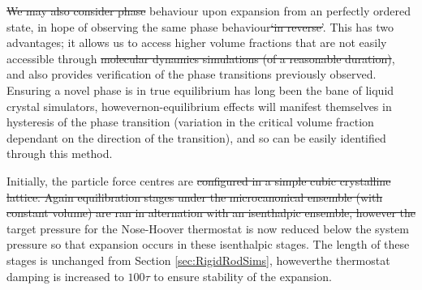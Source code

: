 \documentclass[11pt, a4paper]{article} %
\providecommand{\DIFadd}[1]{{\protect\color{blue}\uwave{#1}}} %
\providecommand{\DIFdel}[1]{{\protect\color{red}\sout{#1}}}                      %
\providecommand{\DIFaddbegin}{} %
\providecommand{\DIFaddend}{} %
\providecommand{\DIFdelbegin}{} %
\providecommand{\DIFdelend}{} %
\begin{document}
\DIFdelbegin \DIFdel{We may also consider phase }\DIFdelend \DIFaddbegin \DIFadd{\textcolor{forestgreen}{We also consider the phase} }\DIFaddend behaviour upon expansion from an perfectly ordered state, in hope of observing the same phase behaviour\DIFdelbegin \DIFdel{`in reverse'}\DIFdelend \DIFaddbegin \DIFadd{,\textcolor{forestgreen}{ which would be expected for an equilibrium system}}\DIFaddend . This has two advantages; it allows us to access higher volume fractions that are not easily accessible through \DIFdelbegin \DIFdel{molecular dynamics simulations (of a reasonable duration)}\DIFdelend \DIFaddbegin \DIFadd{\textcolor{forestgreen}{through the shrinking procedure}}\DIFaddend , and also provides verification of the phase transitions previously observed. Ensuring a novel phase is in true equilibrium has long been the bane of liquid crystal simulators, however\DIFaddbegin \DIFadd{, }\DIFaddend non-equilibrium effects will manifest themselves in \DIFaddbegin \DIFadd{a }\DIFaddend hysteresis of the phase transition (variation in the critical volume fraction dependant on the direction of the transition), and so can be easily identified through this method.

Initially, the particle force centres are \DIFdelbegin \DIFdel{configured in a simple cubic crystalline lattice. Again equilibration stages under the microcanonical ensemble (with constant volume) are ran in alternation with an isenthalpic ensemble, however the }\DIFdelend \DIFaddbegin \DIFadd{\textcolor{forestgreen}{placed on a simple cubic lattice. Again equilibration is run in the microcanonical constant volume and alternated by an isenthalpic ensemble, however,} the }\DIFaddend target pressure for the Nose-Hoover thermostat is now reduced below the system pressure so that expansion occurs in these isenthalpic stages. The length of these stages is unchanged from Section \ref{sec:RigidRodSims}, however\DIFaddbegin \DIFadd{, }\DIFaddend the thermostat damping is increased to $100\tau$ to ensure stability of the expansion.
\end{document}
